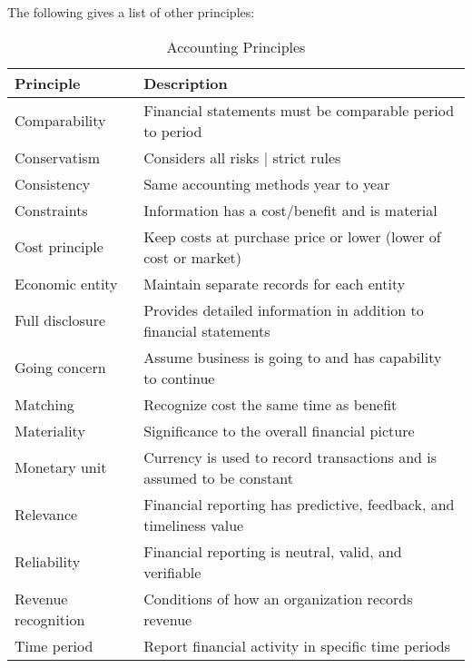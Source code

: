 The following gives a list of other principles:
\begin{table}[H]
    \centering
    \begin{tabular}{|p{}|p{}|}
        \hline
        \textbf{Principle}  & \textbf{Description}                                                  \\
        \hline
        Comparability       & Financial statements must be comparable period to period              \\
        \hline
        Conservatism        & Considers all risks | strict rules                                    \\
        \hline
        Consistency         & Same accounting methods year to year                                  \\
        \hline
        Constraints         & Information has a cost/benefit and is material                        \\
        \hline
        Cost principle      & Keep costs at purchase price or lower (lower of cost or market)       \\
        \hline
        Economic entity     & Maintain separate records for each entity                             \\
        \hline
        Full disclosure     & Provides detailed information in addition to financial statements     \\
        \hline
        Going concern       & Assume business is going to and has capability to continue            \\
        \hline
        Matching            & Recognize cost the same time as benefit                               \\
        \hline
        Materiality         & Significance to the overall financial picture                         \\
        \hline
        Monetary unit       & Currency is used to record transactions and is assumed to be constant \\
        \hline
        Relevance           & Financial reporting has predictive, feedback, and timeliness value    \\
        \hline
        Reliability         & Financial reporting is neutral, valid, and verifiable                 \\
        \hline
        Revenue recognition & Conditions of how an organization records revenue                     \\
        \hline
        Time period         & Report financial activity in specific time periods                    \\
        \hline
    \end{tabular}
    \caption{Accounting Principles}
\end{table}


\newpage
